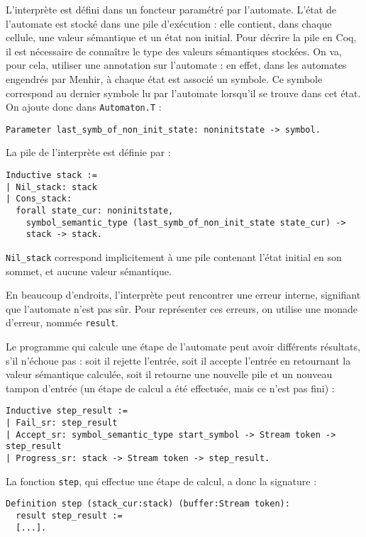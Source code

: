 \documentclass[a4paper,11pt]{article}
\begin{document}
L'interprète est défini dans un foncteur paramétré par l'automate.
L'état de l'automate est stocké dans une pile d'exécution : elle
contient, dans chaque cellule, une valeur sémantique et un état
non initial. Pour décrire la pile en Coq, il est nécessaire de
connaître le type des valeurs sémantiques stockées. On va, pour
cela, utiliser une annotation sur l'automate : en effet, dans les
automates engendrés par Menhir, à chaque état est associé un
symbole. Ce symbole correspond au dernier symbole lu par l'automate
lorsqu'il se trouve dans cet état. On ajoute donc dans
\verb+Automaton.T+ :

\begin{verbatim}
Parameter last_symb_of_non_init_state: noninitstate -> symbol.
\end{verbatim}

La pile de l'interprète est définie par :

\begin{verbatim}
Inductive stack :=
| Nil_stack: stack
| Cons_stack:
  forall state_cur: noninitstate,
    symbol_semantic_type (last_symb_of_non_init_state state_cur) ->
    stack -> stack.
\end{verbatim}

\verb+Nil_stack+ correspond implicitement à une pile contenant l'état
initial en son sommet, et aucune valeur sémantique.

En beaucoup d'endroits, l'interprète peut rencontrer une erreur
interne, signifiant que l'automate n'est pas sûr. Pour représenter
ces erreurs, on utilise une monade d'erreur, nommée \verb+result+.

Le programme qui calcule une étape de l'automate peut avoir différents
résultats, s'il n'échoue pas : soit il rejette l'entrée, soit il
accepte l'entrée en retournant la valeur sémantique calculée, soit il
retourne une nouvelle pile et un nouveau tampon d'entrée (un étape de
calcul a été effectuée, mais ce n'est pas fini) :

\begin{verbatim}
Inductive step_result :=
| Fail_sr: step_result
| Accept_sr: symbol_semantic_type start_symbol -> Stream token -> step_result
| Progress_sr: stack -> Stream token -> step_result.
\end{verbatim}

La fonction \verb+step+, qui effectue une étape de calcul, a donc la
signature :

\begin{verbatim}
Definition step (stack_cur:stack) (buffer:Stream token):
  result step_result :=
  [...].
\end{verbatim}
\end{document}
